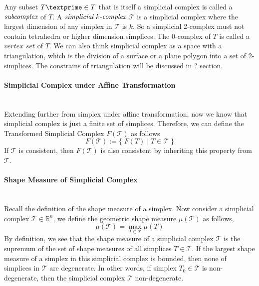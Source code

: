     \indent
    Any subset ${T\textprime}\in{T}$ that is itself a simplicial complex is called a $\emph{subcomplex}$ of ${T}$. A $\emph{simplicial $k$-complex}$ $\mathcal T$ is a simplicial complex where the largest dimension of any simplex in $\mathcal T$ is ${k}$. So a simplicial 2-complex must not contain tetrahedra or higher dimension simplices. The 0-complex of ${T}$ is called a $\textit{vertex set}$ of ${T}$. We can also think simplicial complex as a space with a triangulation, which is the division of a surface or a plane polygon into a set of 2-simplices. The constrains of triangulation will be discussed in ? section.\\

    \paragraph{Simplicial Complex under Affine Transformation}\mbox{}\\
    Extending further from simplex under affine transformation, now we know that simplicial complex is just a finite set of simplices. Therefore, we can define the Transformed Simplicial Complex $F(\mathcal{T})$ as follows
    \begin{equation*}
    F(\mathcal{T}) := \{ \; F(T) \;\vert\; T \in \mathcal{T} \; \}
    \end{equation*}
    If $\mathcal{T}$ is consistent, then $F(\mathcal{T})$ is also consistent by inheriting this property from $\mathcal{T}$.

    \paragraph{Shape Measure of Simplicial Complex}\mbox{}\\
    Recall the definition of the shape measure of a simplex.
    Now consider a simplicial complex $\mathcal{T}\in\mathbb{R}^n$, we define the geometric shape measure $\mu(\mathcal{T})$ as follows,
    \begin{equation*}
    \mu(\mathcal{T}) = \max_{T \in \mathcal{T}} \mu(T)
    \end{equation*}
    By definition, we see that the shape measure of a simplicial complex $\mathcal{T}$ is the supremum of the set of shape measures of all simplices $T\in\mathcal{T}$. If the largest shape measure of a simplex in this simplicial complex is bounded, then none of simplices in $\mathcal{T}$ are degenerate. In other words, if simplex $T_0 \in\mathcal{T}$ is non-degenerate, then the simplicial complex $\mathcal{T}$ non-degenerate.
